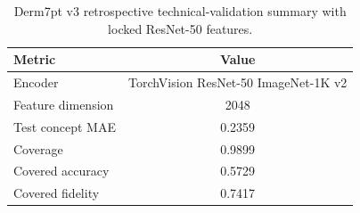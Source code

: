\begin{table}[H]
\caption{Derm7pt v3 retrospective technical-validation summary with locked ResNet-50 features.\label{tab:derm7pt_v3_resnet_summary}}
\centering
\small
\begin{tabular}{lc}
\toprule
Metric & Value \\
\midrule
Encoder & TorchVision ResNet-50 ImageNet-1K v2 \\
Feature dimension & 2048 \\
Test concept MAE & 0.2359 \\
Coverage & 0.9899 \\
Covered accuracy & 0.5729 \\
Covered fidelity & 0.7417 \\
\bottomrule
\end{tabular}
\end{table}
